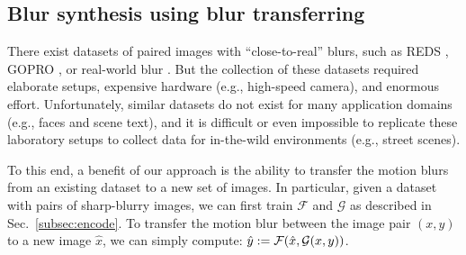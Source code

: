 \documentclass[final]{cvpr}
\newcommand{\Sref}[1]{Sec.~\ref{#1}}
\newcommand{\anh}[1]{{\textcolor{cyan}{[Anh: #1]}}}
\begin{document}
\subsection{Blur synthesis using blur transferring \label{subsec:augment}}

There exist datasets of paired images with ``close-to-real'' blurs, such as REDS \cite{nah2019ntire}, GOPRO \cite{nah2017deep}, or real-world blur \cite{rim_2020_ECCV}. But the collection of these datasets required elaborate setups, expensive hardware (e.g., high-speed camera), and enormous effort. Unfortunately, similar datasets do not exist for many application domains (e.g., faces and scene text), and it is difficult or even impossible to replicate these laboratory setups to collect data for in-the-wild environments (e.g., street scenes). 

To this end, a benefit of our approach is the ability to transfer the motion blurs from an existing dataset to a new set of images. In particular, given a dataset with pairs of sharp-blurry images, we can first train $\mathcal{F}$ and $\mathcal{G}$ as described in \Sref{subsec:encode}. To transfer the motion blur between the image pair $(x, y)$ to a new image $\hat{x}$, we can simply compute: $\hat{y} := \mathcal{F}(\hat{x}, \mathcal{G}(x, y))$.





\end{document}
